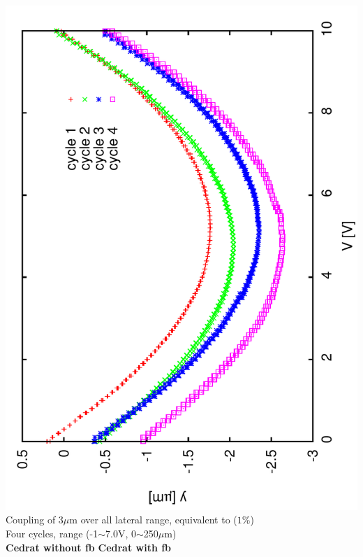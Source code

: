 \documentclass[a4paper,11pt]{book}
\begin{document}
\includegraphics[angle=-90,scale=0.10]{image42.pdf}\\
Coupling of $3\mu$m over all lateral range, equivalent to ($1\%$)\\
{\tiny Four cycles, range (-1$\sim$7.0V, 0$\sim$250$\mu$m)}\\
\textbf{Cedrat without fb} \hspace*{1.6cm}\textbf{Cedrat with fb}\par
\end{document}

